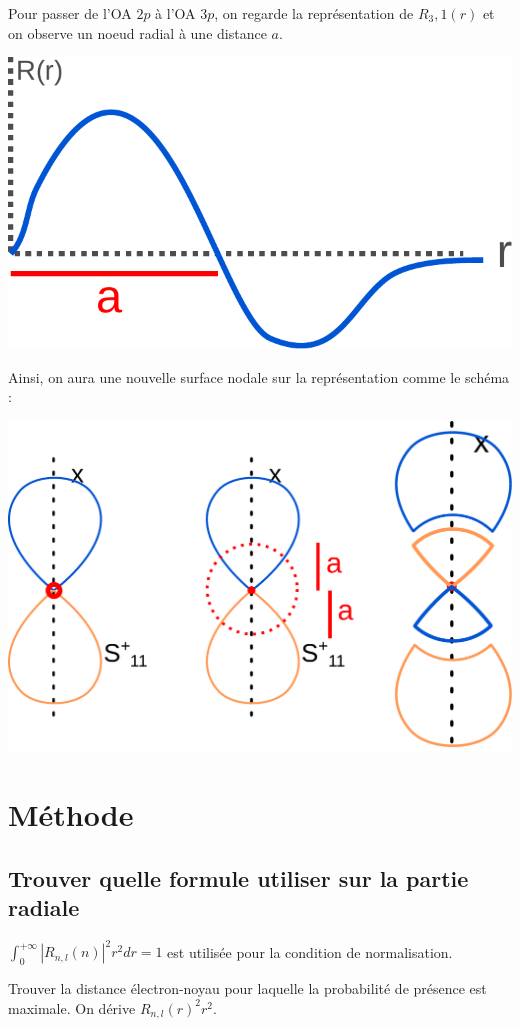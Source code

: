 \documentclass[french]{yLectureNote}
\begin{document}
Pour passer de l'OA $2p$ à l'OA $3p$, on regarde la représentation de $R_3,1(r)$ et on observe un noeud radial à une distance $a$.

\includegraphics[scale=0.5]{3p-r}

Ainsi, on aura une nouvelle surface nodale sur la représentation comme le schéma :

\includegraphics[scale=0.3]{2p-3p}
\section{Méthode}

\subsection{Trouver quelle formule utiliser sur la partie radiale}
 $\int_0^{+\infty} |R_{n,l}(n)|^2 r^2 dr = 1$ est utilisée pour la condition de normalisation.

 Trouver la distance électron-noyau pour laquelle la probabilité de présence est maximale. On dérive $R_{n,l}(r)^2r^2$.
\end{document}
